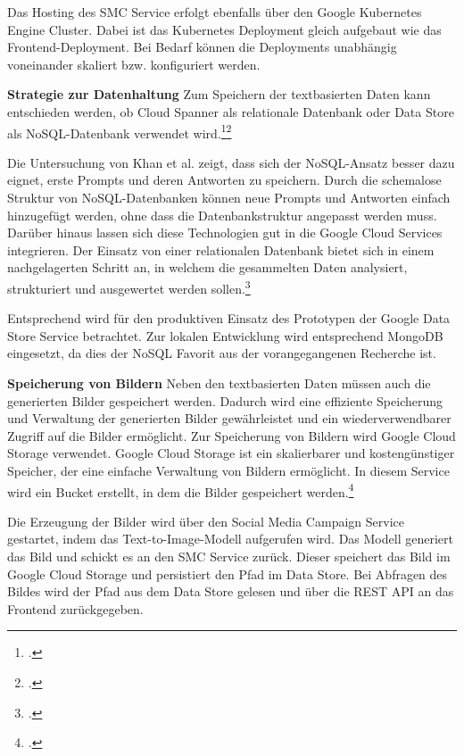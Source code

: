 Das Hosting des \ac{SMC} Service erfolgt ebenfalls über den Google Kubernetes Engine Cluster.
Dabei ist das Kubernetes Deployment gleich aufgebaut wie das Frontend-Deployment.
Bei Bedarf können die Deployments unabhängig voneinander skaliert bzw. konfiguriert werden.

\textbf{Strategie zur Datenhaltung}\newline
Zum Speichern der textbasierten Daten kann entschieden werden, ob Cloud Spanner als relationale Datenbank oder Data Store als \ac{NoSQL}-Datenbank verwendet wird.\footcite{google_spanner}\footcite{google_datastore}

Die Untersuchung von Khan et al. zeigt, dass sich der \ac{NoSQL}-Ansatz besser dazu eignet, erste Prompts und deren Antworten zu speichern.
Durch die schemalose Struktur von \ac{NoSQL}-Datenbanken können neue Prompts und Antworten einfach hinzugefügt werden, ohne dass die Datenbankstruktur angepasst werden muss.
Darüber hinaus lassen sich diese Technologien gut in die Google Cloud Services integrieren.
Der Einsatz von einer relationalen Datenbank bietet sich in einem nachgelagerten Schritt an, in welchem die gesammelten Daten analysiert, strukturiert und ausgewertet werden sollen.\footcite{Khan2022SQL}

Entsprechend wird für den produktiven Einsatz des Prototypen der Google Data Store Service betrachtet.
Zur lokalen Entwicklung wird entsprechend MongoDB eingesetzt, da dies der \ac{NoSQL} Favorit aus der vorangegangenen Recherche ist.

\textbf{Speicherung von Bildern}\newline
Neben den textbasierten Daten müssen auch die generierten Bilder gespeichert werden.
Dadurch wird eine effiziente Speicherung und Verwaltung der generierten Bilder gewährleistet und ein wiederverwendbarer Zugriff auf die Bilder ermöglicht.
Zur Speicherung von Bildern wird Google Cloud Storage verwendet.
Google Cloud Storage ist ein skalierbarer und kostengünstiger Speicher, der eine einfache Verwaltung von Bildern ermöglicht.
In diesem Service wird ein Bucket erstellt, in dem die Bilder gespeichert werden.\footcite{google_storage}

Die Erzeugung der Bilder wird über den Social Media Campaign Service gestartet, indem das Text-to-Image-Modell aufgerufen wird.
Das Modell generiert das Bild und schickt es an den \ac{SMC} Service zurück.
Dieser speichert das Bild im Google Cloud Storage und persistiert den Pfad im Data Store.
Bei Abfragen des Bildes wird der Pfad aus dem Data Store gelesen und über die \ac{REST} \ac{API} an das Frontend zurückgegeben.

